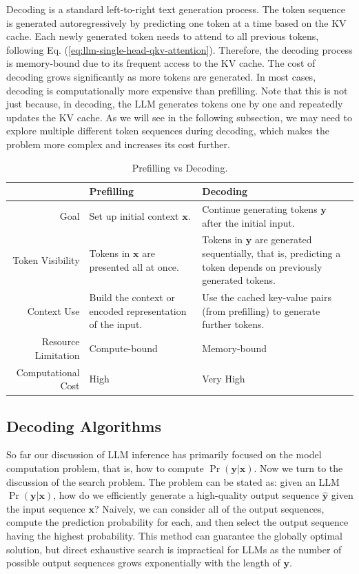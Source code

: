 Decoding is a standard left-to-right text generation process. The token sequence is generated autoregressively by predicting one token at a time based on the KV cache. Each newly generated token needs to attend to all previous tokens, following Eq. (\ref{eq:llm-single-head-qkv-attention}). Therefore, the decoding process is memory-bound due to its frequent access to the KV cache. The cost of decoding grows significantly as more tokens are generated. In most cases, decoding is computationally more expensive than prefilling. Note that this is not just because, in decoding, the LLM generates tokens one by one and repeatedly updates the KV cache. As we will see in the following subsection, we may need to explore multiple different token sequences during decoding, which makes the problem more complex and increases its cost further.

\begin{table}[!t]
\centering
\begingroup
\renewcommand{\arraystretch}{1.2}
\begin{tabular}{r | L{0.30\textwidth} | L{0.30\textwidth}}
& Prefilling & Decoding  \\  \hline
Goal & Set up initial context $\mathbf{x}$. & Continue generating tokens $\mathbf{y}$ after the initial input. \\ \hline
Token Visibility & Tokens in $\mathbf{x}$ are presented all at once. & Tokens in $\mathbf{y}$ are generated sequentially, that is, predicting a token depends on previously generated tokens. \\ \hline
Context Use & Build the context or encoded representation of the input. & Use the cached key-value pairs (from prefilling) to generate further tokens. \\ \hline
Resource Limitation & Compute-bound & Memory-bound \\ \hline
Computational Cost & High & Very High
\end{tabular}
\endgroup
\caption{Prefilling vs Decoding.}
\label{tab:prefilling-vs-decoding}
\end{table}

\subsection{Decoding Algorithms}
\label{sec:llm-decoding-algorithms}

So far our discussion of LLM inference has primarily focused on the model computation problem, that is, how to compute $\Pr(\mathbf{y}|\mathbf{x})$. Now we turn to the discussion of the search problem. The problem can be stated as: given an LLM $\Pr(\mathbf{y}|\mathbf{x})$, how do we efficiently generate a high-quality output sequence $\hat{\mathbf{y}}$ given the input sequence $\mathbf{x}$? Naively, we can consider all of the output sequences, compute the prediction probability for each, and then select the output sequence having the highest probability. This method can guarantee the globally optimal solution, but direct exhaustive search is impractical for LLMs as the number of possible output sequences grows exponentially with the length of $\mathbf{y}$.


